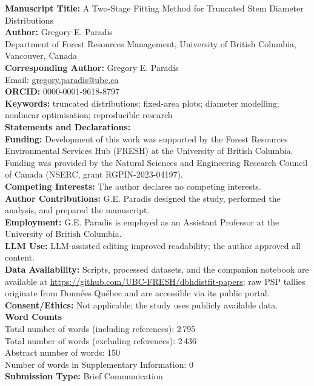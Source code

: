 \documentclass[12pt]{article}
\begin{document}
\thispagestyle{empty}
\doublespacing

\textbf{Manuscript Title:} A Two-Stage Fitting Method for Truncated Stem Diameter Distributions\\[1ex]
\textbf{Author:} Gregory E. Paradis\\
Department of Forest Resources Management, University of British Columbia, Vancouver, Canada\\[1ex]
\textbf{Corresponding Author:} Gregory E. Paradis\\
Email: \href{mailto:gregory.paradis@ubc.ca}{gregory.paradis@ubc.ca}\\[1ex]
\textbf{ORCID:} 0000-0001-9618-8797\\[1ex]
\textbf{Keywords:} truncated distributions; fixed-area plots; diameter modelling; nonlinear optimisation; reproducible research\\[1ex]
\textbf{Statements and Declarations:}\\
\textbf{Funding:} Development of this work was supported by the Forest Resources Environmental Services Hub (FRESH) at the University of British Columbia. Funding was provided by the Natural Sciences and Engineering Research Council of Canada (NSERC, grant RGPIN-2023-04197).\\
\textbf{Competing Interests:} The author declares no competing interests.\\
\textbf{Author Contributions:} G.E. Paradis designed the study, performed the analysis, and prepared the manuscript.\\
\textbf{Employment:} G.E. Paradis is employed as an Assistant Professor at the University of British Columbia.\\
\textbf{LLM Use:} LLM-assisted editing improved readability; the author approved all content.\\
\textbf{Data Availability:} Scripts, processed datasets, and the companion notebook are available at \url{https://github.com/UBC-FRESH/dbhdistfit-papers}; raw PSP tallies originate from Donn\'ees Qu\'ebec and are accessible via its public portal.\\
\textbf{Consent/Ethics:} Not applicable; the study uses publicly available data.\\[1ex]
\textbf{Word Counts}\\
Total number of words (including references): 2\,795\\
Total number of words (excluding references): 2\,436\\
Abstract number of words: 150\\
Number of words in Supplementary Information: 0\\[1ex]
\textbf{Submission Type:} Brief Communication\\
\end{document}
